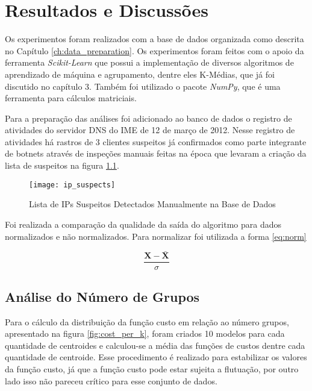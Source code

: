 \chapter{Resultados e Discussões}\label{ch:discussion}

Os experimentos foram realizados com a base de dados organizada como descrita no Capítulo \ref{ch:data_preparation}. Os experimentos foram feitos com o apoio da ferramenta \textit{Scikit-Learn} que possui a implementação de diversos algoritmos de aprendizado de máquina e agrupamento, dentre eles K-Médias, que já foi discutido no capítulo 3. Também foi utilizado o pacote \textit{NumPy}, que é uma ferramenta para cálculos matriciais.

Para a preparação das análises foi adicionado ao banco de dados o registro de atividades do servidor DNS do IME de 12 de março de 2012. Nesse registro de atividades há rastros de 3 clientes suspeitos já confirmados como parte integrante de botnets através de inspeções manuais feitas na época que levaram a criação da lista de suspeitos na figura \ref{fig:suspects}.

\begin{figure}[htbp]
\centering
\texttt{[image: ip\_suspects]}
\caption[Lista de IPs Suspeitos Detectados Manualmente na Base de Dados]{Lista de IPs Suspeitos Detectados Manualmente na Base de Dados} \label{fig:suspects}
\end{figure}

Foi realizada a comparação da qualidade da saída do algoritmo para dados normalizados e não normalizados. Para normalizar foi utilizada a forma \ref{eq:norm}

\begin{equation} \label{eq:norm}
\frac{\mathbf{X} - \mathbf{\bar{X}}}{\sigma}
\end{equation}

\section{Análise do Número de Grupos}

Para o cálculo da distribuição da função custo em relação ao número grupos, apresentado na figura \ref{fig:cost_per_k}, foram criados 10 modelos para cada quantidade de centroides e calculou-se a média das funções de custos dentre cada quantidade de centroide. Esse procedimento é realizado para estabilizar os valores da função custo, já que a função custo pode estar sujeita a flutuação, por outro lado isso não pareceu crítico para esse conjunto de dados.

